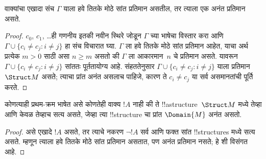 \documentclass[../../../include/open-logic-section]{subfiles}
\begin{document}

\begin{thm}
 वाक्यांचा एखादा संच $\Gamma$ याला हवे तितके मोठे
सांत प्रतिमान असतील, तर त्याला एक अनंत प्रतिमान असते.
\end{thm}

\begin{proof}
$c_0$, $c_1$, \dots ही गणनीय इतकी नवीन स्थिरे जोडून $\Gamma$ च्या भाषेचा
विस्तार करा आणि $\Gamma \cup \{c_i \neq c_j : i \neq j\}$ हा संच विचारात
घ्या. $\Gamma$ ला हवे तितके मोठे सांत प्रतिमान आहेत, याचा अर्थ प्रत्येक
$m >0$ साठी असा $n\ge m$ असतो की $\Gamma$ ला आकारमान~$n$ चे प्रतिमान
असते. यावरून $\Gamma \cup \{c_i \neq c_j : i \neq j\}$ सांततः
पूर्ततायोग्य आहे. संहततेनुसार $\Gamma \cup \{c_i \neq c_j : i \neq j\}$
याला प्रतिमान $\Struct M$ असते; त्याचा प्रांत अनंत असलाच पाहिजे, कारण ते
$c_i \neq c_j$ या सर्व असमानतांची पूर्ति करते.
\end{proof}

\begin{prop}
कोणत्याही प्रथम-क्रम भाषेत असे कोणतेही वाक्य $!A$ नाही की ते
!!a{structure}~$\Struct M$ मध्ये तेव्हा आणि केवळ तेव्हाच सत्य असते, जेव्हा
त्या !!{structure} चा प्रांत $\Domain{M}$ अनंत असतो.
\end{prop}

\begin{proof}
असे एखादे $!A$ असते, तर त्याचे नकरण $\lnot !A$ सर्व आणि फक्त सांत
!!{structure}s मध्ये सत्य असते. म्हणून त्याला हवे तितके मोठे सांत प्रतिमान
असतात, पण अनंत प्रतिमान नसते; हे  शी विसंगत आहे.
\end{proof}
\end{document}
